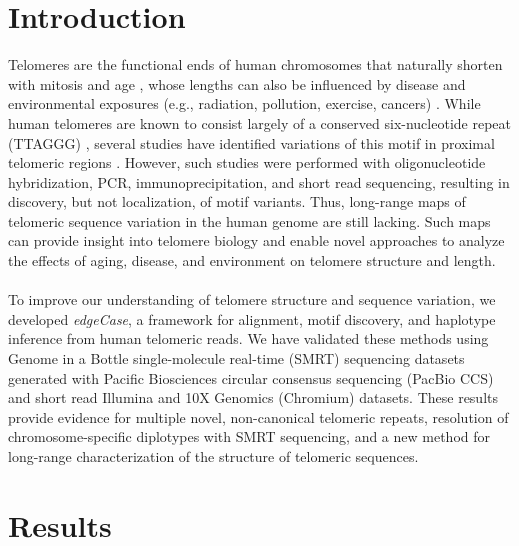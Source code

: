 \documentclass{article}
\begin{document}
\section*{Introduction} 
Telomeres are the functional ends of human chromosomes that naturally shorten with mitosis and age \cite{teloaging}, whose lengths can also be influenced by disease and environmental exposures (e.g., radiation, pollution, exercise, cancers) \cite{teloeffects}.
While human telomeres are known to consist largely of a conserved six-nucleotide repeat (TTAGGG) \cite{moyzis}, several studies have identified variations of this motif in proximal telomeric regions \cite{telovars1989,telovars1999,telovars2018,telovars2019}.
However, such studies were performed with oligonucleotide hybridization, PCR, immunoprecipitation, and short read sequencing, resulting in discovery, but not localization, of motif variants.
Thus, long-range maps of telomeric sequence variation in the human genome are still lacking.
Such maps can provide insight into telomere biology and enable novel approaches to analyze the effects of aging, disease, and environment on telomere structure and length.
\\~\\
To improve our understanding of telomere structure and sequence variation, we developed \textit{edgeCase}, a framework for alignment, motif discovery, and haplotype inference from human telomeric reads.
We have validated these methods using Genome in a Bottle \cite{giab} single-molecule real-time (SMRT) sequencing datasets generated with Pacific Biosciences circular consensus sequencing (PacBio CCS) \cite{pacbio,pacbioccs} and short read Illumina \cite{illumina} and 10X Genomics (Chromium) \cite{10x} datasets.
These results provide evidence for multiple novel, non-canonical telomeric repeats, resolution of chromosome-specific diplotypes with SMRT sequencing, and a new method for long-range characterization of the structure of telomeric sequences.

\section*{Results} 
\end{document}
